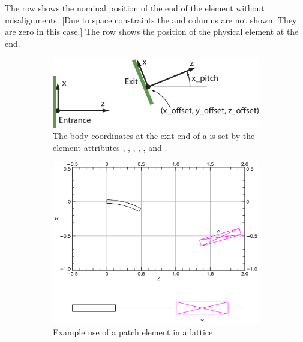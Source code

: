 \documentclass{hitec}
\begin{document}
The  row shows the nominal position of the  end of the element without
misalignments. [Due to space constraints the  and  columns are not shown. They are
zero in this case.] The  row shows the position of the physical element at the  end.

\begin{figure}[tb]
  \centering
  \begin{subfigure}[b]{0.48\textwidth}
    \includegraphics[width=\textwidth]{patch.pdf}
    \caption{The body coordinates at the exit end of a  is set by the element attributes
, , , , , and .}
    \label{f:patch}
  \end{subfigure}
  \hfil
  \begin{subfigure}[b]{0.48\textwidth}
    \includegraphics[width=\textwidth]{patch-example.pdf}
    \caption{Example use of a patch element in a lattice.}
    \label{f:patch.example}
  \end{subfigure}
  \caption{}
\end{figure}
\end{document}
